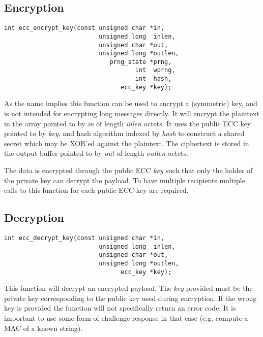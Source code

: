 \documentclass[synpaper]{book}
\begin{document}
\subsection{Encryption}
\begin{verbatim}
int ecc_encrypt_key(const unsigned char *in,
                          unsigned long  inlen,
                          unsigned char *out,
                          unsigned long *outlen,
                             prng_state *prng,
                                    int  wprng,
                                    int  hash,
                                ecc_key *key);
\end{verbatim}

As the name implies this function can be used to encrypt a (symmetric) key, and is not intended for encrypting long messages directly.  It will encrypt the
plaintext in the array pointed to by \textit{in} of length \textit{inlen} octets.  It uses the public ECC key pointed to by \textit{key}, and
hash algorithm indexed by \textit{hash} to construct a shared secret which may be XOR'ed against the plaintext.  The ciphertext is stored in
the output buffer pointed to by \textit{out} of length \textit{outlen} octets.

The data is encrypted through the public ECC \textit{key} such that only the holder of the private key can decrypt the payload.
To have multiple recipients multiple calls to this function for each public ECC key are required.

\subsection{Decryption}
\begin{verbatim}
int ecc_decrypt_key(const unsigned char *in,
                          unsigned long  inlen,
                          unsigned char *out,
                          unsigned long *outlen,
                                ecc_key *key);
\end{verbatim}

This function will decrypt an encrypted payload.  The \textit{key} provided must be the private key corresponding to the public key
used during encryption.  If the wrong key is provided the function will not specifically return an error code.  It is important
to use some form of challenge response in that case (e.g. compute a MAC of a known string).
\end{document}
